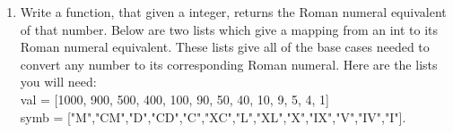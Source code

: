 \documentclass[11pt, letterpaper, onecolumn, oneside, final]{article}
\begin{document}
\begin{enumerate}
    \item Write a function, that given a integer, returns the Roman numeral equivalent of that number. Below are two lists which give a mapping from an {\consolas int} to its Roman numeral equivalent. These lists give all of the base cases needed to convert any number to its corresponding Roman numeral. Here are the lists you will need: \\
{\consolas 
val = [1000, 900, 500, 400, 100, 90, 50, 40, 10, 9, 5, 4, 1]\\
symb = ["M","CM","D","CD","C","XC","L","XL","X","IX","V","IV","I"]}.
    
    
    
    

\end{enumerate}
\end{document}
